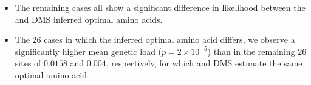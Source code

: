 \documentclass[12pt]{article}
\begin{document}
\begin{itemize}
\begin{itemize}
\begin{itemize}
			\item The remaining cases all show a significant difference in likelihood between the \selac and DMS inferred optimal amino acids.
			\item The $26$ cases in which the inferred optimal amino acid differs, we observe a significantly higher mean genetic load ($p = 2\times10^{-5}$) than in the remaining $26$ sites of $0.0158$ and $0.004$, respectively, for which \selac and DMS estimate the same optimal amino acid
		\end{itemize}
	\end{itemize}
\end{itemize}


    
\end{document}
